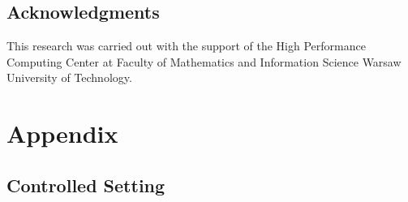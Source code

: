 \documentclass[a4paper,11pt,twoside]{report}
\theoremstyle{definition}
\begin{document}
\section*{Acknowledgments}

This research was carried out with the support of the High Performance Computing Center at Faculty of Mathematics and Information Science Warsaw University of Technology.

\newpage

\chapter*{Appendix}

\section*{Controlled Setting}
\end{document}
